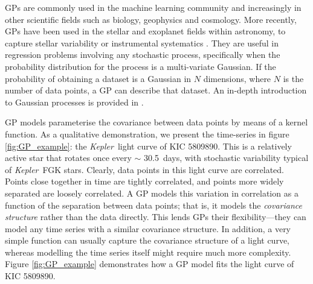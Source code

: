 \documentclass[a4paper,fleqn,usenatbib,useAMS]{mnras}
\newcommand{\Kepler}{{\it Kepler}}
\newcommand{\kepler}{\Kepler}
\newcommand{\eg}{{\it e.g.}}
\newcommand{\kepexample}{5809890}
\newcommand{\kepexampleperiod}{30.5}
\begin{document}
GPs are commonly used in the machine learning community and increasingly
in other scientific fields such as biology, geophysics and cosmology.
More recently, GPs have been used in the stellar and exoplanet fields within
astronomy, to capture stellar variability or instrumental systematics
\citep[see \eg][]{Gibson2012, Haywood2014, Dawson2014, Barclay2015,
Haywood2015, Evans2015, Rajpaul2015, Czekala2015, Vanderburg2015, Rajpaul2016,
Aigrain2016, Littlefair2017}.
They are useful in regression problems involving any stochastic process,
specifically when the probability distribution for the process is a
multi-variate Gaussian.
If the probability of obtaining a dataset is a Gaussian in $N$ dimensions,
where $N$ is the number of data points, a GP can describe that dataset.
An in-depth introduction to Gaussian processes is provided in
\citet{Rasmussen2005}.

GP models parameterise the covariance between data points by means of a
kernel function.
As a qualitative demonstration, we present the time-series in figure
\ref{fig:GP_example}: the \kepler\ light curve of KIC \kepexample.
This is a relatively active star that rotates once every $\sim$
\kepexampleperiod\ days, with stochastic variability typical of \kepler\ FGK
stars.
Clearly, data points in this light curve are correlated.
Points close together in time are tightly correlated, and points more
widely separated are loosely correlated.
A GP models this variation in correlation as a function of the separation
between data points; that is, it models the {\it covariance structure} rather
than the data directly.
This lends GPs their flexibility---they can model any time
series with a similar covariance structure.
In addition, a very simple function can usually capture the covariance
structure of a light curve, whereas modelling the time series itself
might require much more complexity.
Figure \ref{fig:GP_example} demonstrates how a GP model fits the light curve of
KIC \kepexample.
\end{document}
